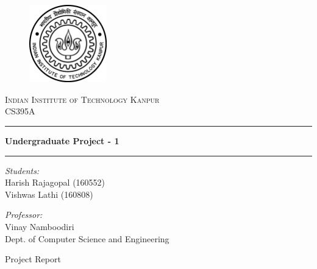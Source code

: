 \documentclass[12pt,a4paper]{article}
\begin{document}
    \begin{titlepage}
        \centering

        \vspace*{2cm}
        \begin{figure}[h]
            \centering
            \includegraphics[width=0.3\textwidth]{images/iitk-logo.png}\\[15mm]
        \end{figure}
        \textsc{\LARGE Indian Institute of Technology Kanpur}\\[1cm]
        {\Large CS395A}\\[7mm]

        \hrule
        \vspace{3mm}
        \textbf{\Large Undergraduate Project - 1}\\[5mm]
        \hrule
        \vspace{3mm}

        \begin{multicols}{2}
            \textit{Students:}\\[2mm]
            Harish Rajagopal (160552)\\
            Vishwas Lathi (160808)\\

            \vfill\null\columnbreak

            \textit{Professor:}\\[2mm]
            Vinay Namboodiri\\
            Dept. of Computer Science and Engineering
        \end{multicols}
    \end{titlepage}

    \begin{center}
        \LARGE Project Report
        \vspace{15mm}
    \end{center}
\end{document}
